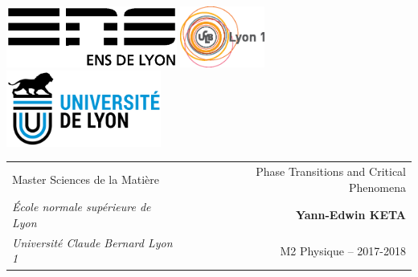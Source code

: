 \documentclass[class=report, float=false, crop=false]{standalone}
\begin{document}
\thispagestyle{empty}

\includegraphics[height=2cm]{logoens.eps} \hfill \includegraphics[height=2cm]{logoucbl.eps} \hfill \includegraphics[height=2.5cm]{udl-logo.png}

\vspace{0.5cm}

\begin{tabularx}{\textwidth}{ @{} l X r @{} }
{\sc Master Sciences de la Matière} & & Phase Transitions and Critical Phenomena \\
{\it École normale supérieure de Lyon} & & \textbf{Yann-Edwin KETA} \\
{\it Université Claude Bernard Lyon 1} & & M2 Physique -- 2017-2018
\end{tabularx}
\end{document}
